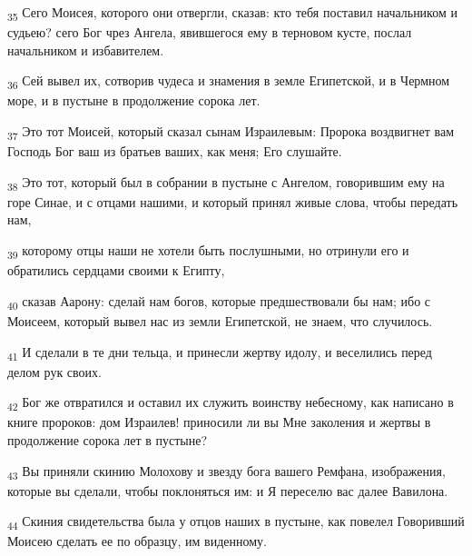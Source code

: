 \begin{tcolorbox}
\textsubscript{35} Сего Моисея, которого они отвергли, сказав: кто тебя поставил начальником и судьею? сего Бог чрез Ангела, явившегося ему в терновом кусте, послал начальником и избавителем.
\end{tcolorbox}
\begin{tcolorbox}
\textsubscript{36} Сей вывел их, сотворив чудеса и знамения в земле Египетской, и в Чермном море, и в пустыне в продолжение сорока лет.
\end{tcolorbox}
\begin{tcolorbox}
\textsubscript{37} Это тот Моисей, который сказал сынам Израилевым: Пророка воздвигнет вам Господь Бог ваш из братьев ваших, как меня; Его слушайте.
\end{tcolorbox}
\begin{tcolorbox}
\textsubscript{38} Это тот, который был в собрании в пустыне с Ангелом, говорившим ему на горе Синае, и с отцами нашими, и который принял живые слова, чтобы передать нам,
\end{tcolorbox}
\begin{tcolorbox}
\textsubscript{39} которому отцы наши не хотели быть послушными, но отринули его и обратились сердцами своими к Египту,
\end{tcolorbox}
\begin{tcolorbox}
\textsubscript{40} сказав Аарону: сделай нам богов, которые предшествовали бы нам; ибо с Моисеем, который вывел нас из земли Египетской, не знаем, что случилось.
\end{tcolorbox}
\begin{tcolorbox}
\textsubscript{41} И сделали в те дни тельца, и принесли жертву идолу, и веселились перед делом рук своих.
\end{tcolorbox}
\begin{tcolorbox}
\textsubscript{42} Бог же отвратился и оставил их служить воинству небесному, как написано в книге пророков: дом Израилев! приносили ли вы Мне заколения и жертвы в продолжение сорока лет в пустыне?
\end{tcolorbox}
\begin{tcolorbox}
\textsubscript{43} Вы приняли скинию Молохову и звезду бога вашего Ремфана, изображения, которые вы сделали, чтобы поклоняться им: и Я переселю вас далее Вавилона.
\end{tcolorbox}
\begin{tcolorbox}
\textsubscript{44} Скиния свидетельства была у отцов наших в пустыне, как повелел Говоривший Моисею сделать ее по образцу, им виденному.
\end{tcolorbox}
